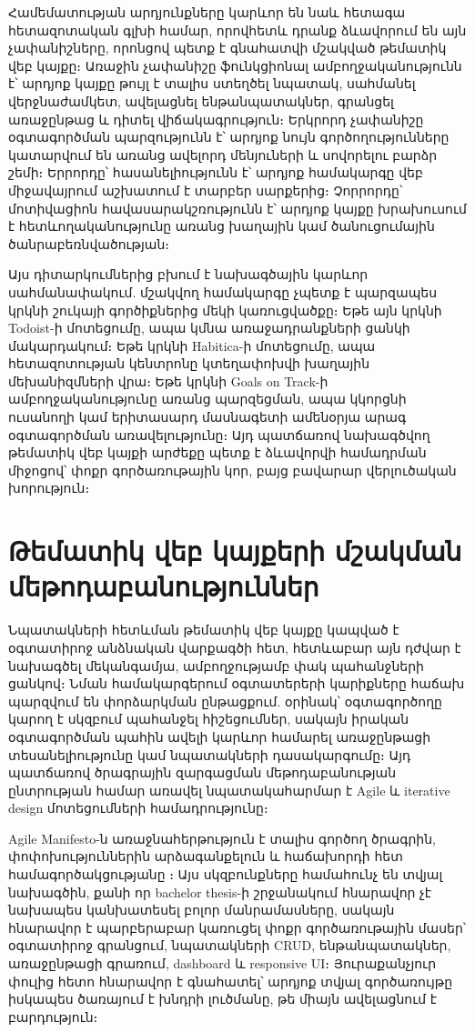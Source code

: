 Համեմատության արդյունքները կարևոր են նաև հետագա հետազոտական գլխի համար, որովհետև դրանք ձևավորում են այն չափանիշները, որոնցով պետք է գնահատվի մշակված թեմատիկ վեբ կայքը։ Առաջին չափանիշը ֆունկցիոնալ ամբողջականությունն է՝ արդյոք կայքը թույլ է տալիս ստեղծել նպատակ, սահմանել վերջնաժամկետ, ավելացնել ենթանպատակներ, գրանցել առաջընթաց և դիտել վիճակագրություն։ Երկրորդ չափանիշը օգտագործման պարզությունն է՝ արդյոք նույն գործողությունները կատարվում են առանց ավելորդ մենյուների և սովորելու բարձր շեմի։ Երրորդը՝ հասանելիությունն է՝ արդյոք համակարգը վեբ միջավայրում աշխատում է տարբեր սարքերից։ Չորրորդը՝ մոտիվացիոն հավասարակշռությունն է՝ արդյոք կայքը խրախուսում է հետևողականությունը առանց խաղային կամ ծանուցումային ծանրաբեռնվածության։

Այս դիտարկումներից բխում է նախագծային կարևոր սահմանափակում. մշակվող համակարգը չպետք է պարզապես կրկնի շուկայի գործիքներից մեկի կառուցվածքը։ Եթե այն կրկնի Todoist-ի մոտեցումը, ապա կմնա առաջադրանքների ցանկի մակարդակում։ Եթե կրկնի Habitica-ի մոտեցումը, ապա հետազոտության կենտրոնը կտեղափոխվի խաղային մեխանիզմների վրա։ Եթե կրկնի Goals on Track-ի ամբողջականությունը առանց պարզեցման, ապա կկորցնի ուսանողի կամ երիտասարդ մասնագետի ամենօրյա արագ օգտագործման առավելությունը։ Այդ պատճառով նախագծվող թեմատիկ վեբ կայքի արժեքը պետք է ձևավորվի համադրման միջոցով՝ փոքր գործառութային կոր, բայց բավարար վերլուծական խորություն։

\section{Թեմատիկ վեբ կայքերի մշակման մեթոդաբանություններ}

Նպատակների հետևման թեմատիկ վեբ կայքը կապված է օգտատիրոջ անձնական վարքագծի հետ, հետևաբար այն դժվար է նախագծել մեկանգամյա, ամբողջությամբ փակ պահանջների ցանկով։ Նման համակարգերում օգտատերերի կարիքները հաճախ պարզվում են փորձարկման ընթացքում. օրինակ՝ օգտագործողը կարող է սկզբում պահանջել հիշեցումներ, սակայն իրական օգտագործման պահին ավելի կարևոր համարել առաջընթացի տեսանելիությունը կամ նպատակների դասակարգումը։ Այդ պատճառով ծրագրային զարգացման մեթոդաբանության ընտրության համար առավել նպատակահարմար է Agile և iterative design մոտեցումների համադրությունը։

Agile Manifesto-ն առաջնահերթություն է տալիս գործող ծրագրին, փոփոխություններին արձագանքելուն և հաճախորդի հետ համագործակցությանը \autocite{beck2001agile}։ Այս սկզբունքները համահունչ են տվյալ նախագծին, քանի որ bachelor thesis-ի շրջանակում հնարավոր չէ նախապես կանխատեսել բոլոր մանրամասները, սակայն հնարավոր է պարբերաբար կառուցել փոքր գործառութային մասեր՝ օգտատիրոջ գրանցում, նպատակների CRUD, ենթանպատակներ, առաջընթացի գրառում, dashboard և responsive UI։ Յուրաքանչյուր փուլից հետո հնարավոր է գնահատել՝ արդյոք տվյալ գործառույթը իսկապես ծառայում է խնդրի լուծմանը, թե միայն ավելացնում է բարդություն։

